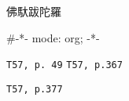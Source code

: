 \documentclass[11pt]{article}
\date{\today}
\begin{document}

\begin{letter}{%
\mbox{}}

\opening{佛馱跋陀羅}

\#-*- mode: org; -*-
























\texttt{T57, p. 49}
\texttt{T57, p.367}






















































\texttt{T57, p.377}

\closing{}

\end{letter}
\end{document}
